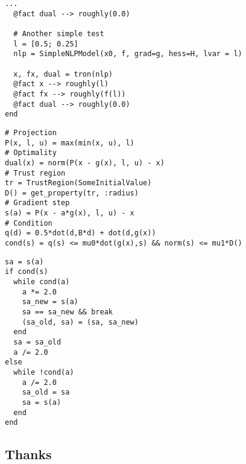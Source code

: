 \begin{frame}[t,fragile]
\begin{lstlisting}[basicstyle=\scriptsize\tt]
  ...
  @fact dual --> roughly(0.0)

  # Another simple test
  l = [0.5; 0.25]
  nlp = SimpleNLPModel(x0, f, grad=g, hess=H, lvar = l)

  x, fx, dual = tron(nlp)
  @fact x --> roughly(l)
  @fact fx --> roughly(f(l))
  @fact dual --> roughly(0.0)
end
\end{lstlisting}
\end{frame}


\begin{frame}[t,fragile]
\begin{lstlisting}[basicstyle=\scriptsize\tt]
# Projection
P(x, l, u) = max(min(x, u), l)
# Optimality
dual(x) = norm(P(x - g(x), l, u) - x)
# Trust region
tr = TrustRegion(SomeInitialValue)
D() = get_property(tr, :radius)
# Gradient step
s(a) = P(x - a*g(x), l, u) - x
# Condition
q(d) = 0.5*dot(d,B*d) + dot(d,g(x))
cond(s) = q(s) <= mu0*dot(g(x),s) && norm(s) <= mu1*D()
\end{lstlisting}
\end{frame}

\begin{frame}[t,fragile]
\begin{lstlisting}[basicstyle=\scriptsize\tt]
sa = s(a)
if cond(s)
  while cond(a)
    a *= 2.0
    sa_new = s(a)
    sa == sa_new && break
    (sa_old, sa) = (sa, sa_new)
  end
  sa = sa_old
  a /= 2.0
else
  while !cond(a)
    a /= 2.0
    sa_old = sa
    sa = s(a)
  end
end
\end{lstlisting}
\end{frame}


\subsection{Thanks}
